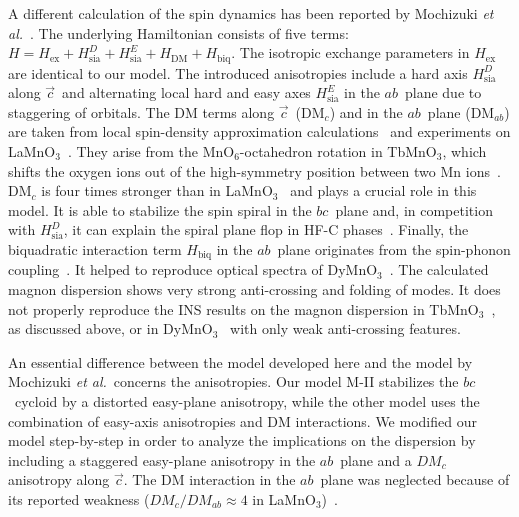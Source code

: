 \documentclass[aps,prb,twocolumn,superscriptaddress,showpacs,floatfix]{revtex4-2}
\newcommand{\tbmno}{TbMnO$_3$}
\newcommand{\lamno}{LaMnO$_3$}
\newcommand{\caxis}{$\vec{c}$}
\newcommand{\abplane}{$ab$}
\newcommand{\bcplane}{$bc$}
\newcommand{\etal}{\textit{et al.}}
\newcommand{\dymno}{DyMnO$_3$}
\begin{document}
A different calculation of the spin dynamics has been reported by Mochizuki \etal~\cite{Mochizuki2010c}. The underlying Hamiltonian consists of five terms: $H=H_{\textrm{ex}}+H_{\textrm{sia}}^D+H_{\textrm{sia}}^E+H_{\textrm{DM}}+H_{\textrm{biq}}$.
The isotropic exchange parameters in $H_{\textrm{ex}}$ are identical to our model. The introduced anisotropies include a hard axis $H_{\textrm{sia}}^D$ along \caxis\ and alternating local hard and easy axes $H_{\textrm{sia}}^E$ in the \abplane\ plane due to staggering of orbitals. The DM terms along \caxis\ (DM$_c$) and in the \abplane\ plane (DM$_{ab}$) are taken from local spin-density approximation calculations~\cite{Solovyev1996} and experiments on \lamno~\cite{Deisenhofer2002}. They arise from the MnO$_6$-octahedron rotation in \tbmno , which shifts the oxygen ions out of  the high-symmetry position between two Mn ions~\cite{Solovyev1996,Tovar1999}. DM$_c$ is four times stronger than in LaMnO$_3$~\cite{Deisenhofer2002} and plays a crucial role in this model. It is able to stabilize the spin spiral in the \bcplane\ plane and, in competition with $H_{\textrm{sia}}^D$, it can explain the spiral plane flop in HF-C phases~\cite{Mochizuki2009,Mochizuki2009a,Mochizuki2010}. Finally, the biquadratic interaction term $H_{\textrm{biq}}$ in the \abplane\ plane originates from the spin-phonon coupling~\cite{Kaplan2009}. It helped to reproduce optical spectra of \dymno~\cite{Mochizuki2010c}. The calculated magnon dispersion shows very strong anti-crossing and folding of modes. It does not properly reproduce the INS results on the magnon dispersion in \tbmno~\cite{Senff2008a}, as discussed above, or in \dymno~\cite{Finger2014} with only weak anti-crossing features.



An essential difference between the model developed here and the model by Mochizuki \etal\ concerns the anisotropies. Our model M-II stabilizes the \bcplane \ cycloid by a distorted easy-plane anisotropy, while the other model uses the combination of easy-axis anisotropies and DM interactions. We modified our model step-by-step in order to analyze the implications on the dispersion by including a staggered easy-plane anisotropy in the \abplane\ plane and a $DM_c$ anisotropy along \caxis.
The DM interaction in the \abplane\ plane was neglected because of its reported weakness ($DM_c/DM_{ab}\approx4$ in \lamno)~\cite{Deisenhofer2002}.
\end{document}
